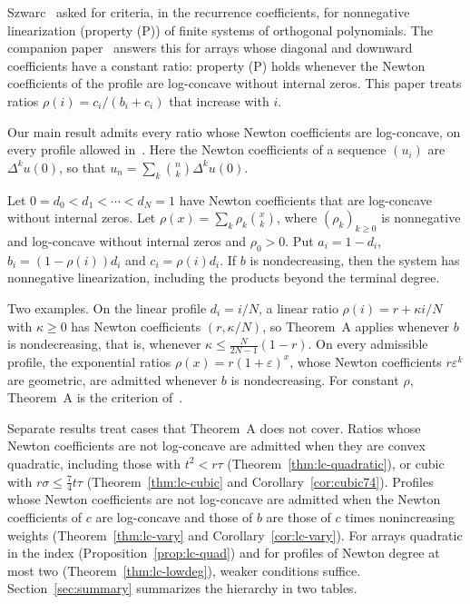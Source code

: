 Szwarc~\cite[\S5, Problem~2]{szwarc} asked for criteria, in the recurrence coefficients, for nonnegative linearization (property (P)) of finite systems of orthogonal polynomials. The companion paper~\cite{P1} answers this for arrays whose diagonal and downward coefficients have a constant ratio: property (P) holds whenever the Newton coefficients of the profile are log-concave without internal zeros. This paper treats ratios $\rho(i)=c_i/(b_i+c_i)$ that increase with $i$.

Our main result admits every ratio whose Newton coefficients are log-concave, on every profile allowed in~\cite{P1}. Here the Newton coefficients of a sequence $(u_i)$ are $\Delta^ku(0)$, so that $u_n=\sum_k\binom nk\Delta^ku(0)$.

\begin{mainthm}
Let $0=d_0<d_1<\cdots<d_N=1$ have Newton coefficients that are log-concave without internal zeros. Let $\rho(x)=\sum_k\rho_k\binom xk$, where $(\rho_k)_{k\geq0}$ is nonnegative and log-concave without internal zeros and $\rho_0>0$. Put $a_i=1-d_i$, $b_i=(1-\rho(i))d_i$ and $c_i=\rho(i)d_i$. If $b$ is nondecreasing, then the system has nonnegative linearization, including the products beyond the terminal degree.
\end{mainthm}

Two examples. On the linear profile $d_i=i/N$, a linear ratio $\rho(i)=r+\kappa i/N$ with $\kappa\geq0$ has Newton coefficients $(r,\kappa/N)$, so Theorem~A applies whenever $b$ is nondecreasing, that is, whenever $\kappa\leq\frac N{2N-1}(1-r)$. On every admissible profile, the exponential ratios $\rho(x)=r(1+\varepsilon)^x$, whose Newton coefficients $r\varepsilon^k$ are geometric, are admitted whenever $b$ is nondecreasing. For constant $\rho$, Theorem~A is the criterion of~\cite{P1}.

Separate results treat cases that Theorem~A does not cover. Ratios whose Newton coefficients are not log-concave are admitted when they are convex quadratic, including those with $t^2<r\tau$ (Theorem~\ref{thm:lc-quadratic}), or cubic with $r\sigma\leq\frac74t\tau$ (Theorem~\ref{thm:lc-cubic} and Corollary~\ref{cor:cubic74}). Profiles whose Newton coefficients are not log-concave are admitted when the Newton coefficients of $c$ are log-concave and those of $b$ are those of $c$ times nonincreasing weights (Theorem~\ref{thm:lc-vary} and Corollary~\ref{cor:lc-vary}). For arrays quadratic in the index (Proposition~\ref{prop:lc-quad}) and for profiles of Newton degree at most two (Theorem~\ref{thm:lc-lowdeg}), weaker conditions suffice. Section~\ref{sec:summary} summarizes the hierarchy in two tables.


